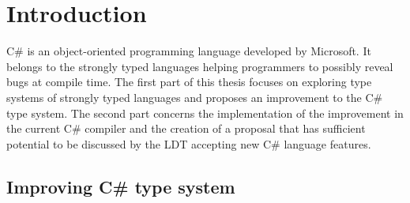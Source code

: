 \chapter{Introduction}

C\# is an object-oriented programming language developed by Microsoft. 
It belongs to the strongly typed languages helping programmers to possibly reveal bugs at compile time. 
The first part of this thesis focuses on exploring type systems of strongly typed languages and proposes an improvement to the C\# type system. 
The second part concerns the implementation of the improvement in the current C\# compiler and the creation of a proposal that has sufficient potential to be discussed by the \ac{LDT} accepting new C\# language features.

\section{Improving C\# type system} \label{sect01:imprv}

